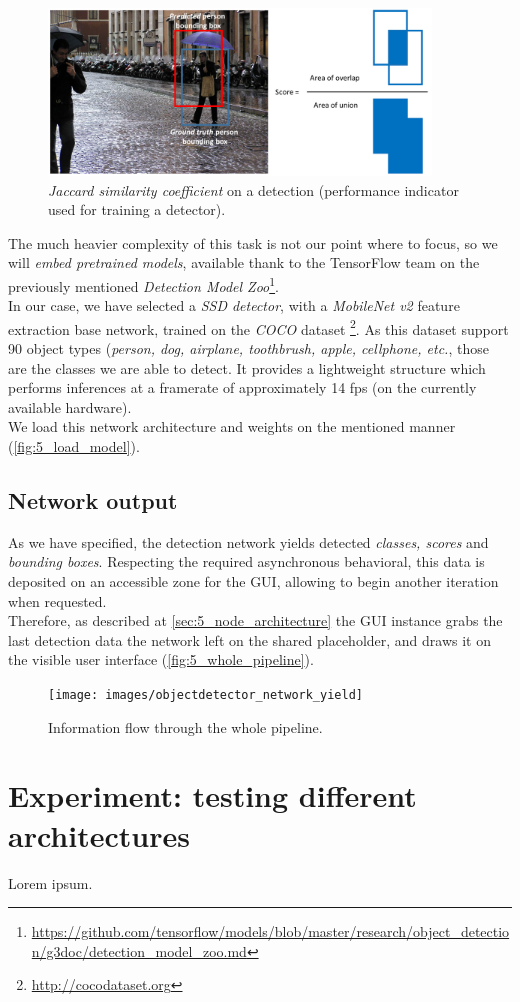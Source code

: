		\begin{figure}[h!]
			\centering
			\includegraphics[width=4in]{images/detection_iou}
			\caption{\emph{Jaccard similarity coefficient} on a detection (performance indicator used for training a detector).}
			\label{fig:5_iou}
		\end{figure}
	
		The much heavier complexity of this task is not our point where to focus, so we will \emph{embed pretrained models}, available thank to the TensorFlow team on the previously mentioned \emph{Detection Model Zoo}\footnote{\url{https://github.com/tensorflow/models/blob/master/research/object_detection/g3doc/detection_model_zoo.md}}.\\
		
		In our case, we have selected a \emph{SSD detector}, with a \emph{MobileNet v2} feature extraction base network, trained on the \emph{COCO} dataset \footnote{\url{http://cocodataset.org}}. As this dataset support 90 object types (\emph{person, dog, airplane, toothbrush, apple, cellphone, etc.}, those are the classes we are able to detect. It provides a lightweight structure which performs inferences at a framerate of approximately 14 fps (on the currently available hardware).\\
		
		We load this network architecture and weights on the mentioned manner (\autoref{fig:5_load_model}). 
	
	
	\subsection{Network output}
		As we have specified, the detection network yields detected \emph{classes, scores} and \emph{bounding boxes}. Respecting the required asynchronous behavioral, this data is deposited on an accessible zone for the GUI, allowing to begin another iteration when requested.\\
		
		Therefore, as described at \autoref{sec:5_node_architecture} the GUI instance grabs the last detection data the network left on the shared placeholder, and draws it on the visible user interface (\autoref{fig:5_whole_pipeline}).
		
		\begin{figure}[h]
			\centering
			\texttt{[image: images/objectdetector\_network\_yield]}
			\caption{Information flow through the whole pipeline.}
			\label{fig:5_whole_pipeline}
		\end{figure}


\section{Experiment: testing different architectures}
	Lorem ipsum.
	
	
	
	
	
	
	
	
	
	
	
	
	
	
	
	